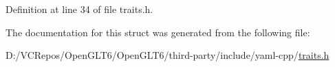 Definition at line 34 of file traits.\+h.



The documentation for this struct was generated from the following file\+:\begin{DoxyCompactItemize}
\item 
D\+:/\+V\+C\+Repos/\+Open\+G\+L\+T6/\+Open\+G\+L\+T6/third-\/party/include/yaml-\/cpp/\mbox{\hyperlink{traits_8h}{traits.\+h}}\end{DoxyCompactItemize}
